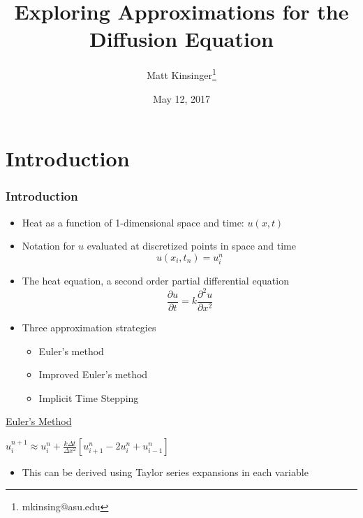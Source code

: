 \documentclass[compress]{beamer}
\title{Exploring Approximations for the Diffusion Equation}
\author{ Matt Kinsinger\thanks{mkinsing@asu.edu} }
\date{May 12, 2017}
\institute[Mathematics and Statistics]{
\texttt{[image: ASUlogo.pdf]} \\
{\color{ASUred} SCHOOL OF \textbf{MATHEMATICAL AND STATISTICAL SCIENCES}}}
\begin{document}
%
%
\begin{frame}[plain]
	\titlepage
	\transboxout
\end{frame}

%
%
\section{Introduction}\label{Introduction}

\begin{frame}\frametitle{Introduction} %
\begin{itemize}
\item Heat as a function of 1-dimensional space and time: $u(x,t)$
\item Notation for $u$ evaluated at discretized points in space and time $$u(x_i,t_n)=u_i^n$$
\item The heat equation, a second order partial differential equation
$$\frac{\partial u}{\partial t}=k\frac{\partial ^2u}{\partial x^2 }$$
\item Three approximation strategies
\begin{itemize}
\item Euler's method
\item Improved Euler's method
\item Implicit Time Stepping
\end{itemize}
\end{itemize}
\end{frame}

\begin{frame}
\begin{center}
\underline{Euler's Method} 
\vspace{.2in}

$u_i^{n+1}\approx u_i^n+\frac{k\Delta t}{\Delta x^2}\left[u_{i+1}^n-2u_i^n+u_{i-1}^n\right]$
\end{center}
\begin{itemize}
\item This can be derived using Taylor series expansions in each variable
\end{itemize}
\end{frame}
\end{document}
